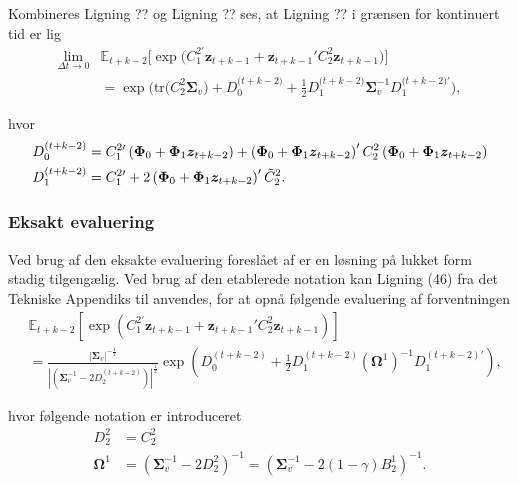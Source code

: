 \documentclass[
  a4paper,
  oneside]{memoir}
\begin{document}
Kombineres Ligning ?? og Ligning ?? ses, at Ligning ?? i grænsen for kontinuert tid er lig
\begin{align*}
\lim_{\Delta t \to 0} &\mathbb{E}_{t+k-2}\Big[ \exp\Big( C_1^{2\prime} \bm{z}_{t+k-1} + \bm{z}_{t+k-1}' C_2^2 \bm{z}_{t+k-1} \Big)\Big]\\
                      &=\exp\Big( \text{tr}\Big(C_2^2\bm{\Sigma}_v\Big) + D_0^{\Big(t+k-2\Big)} + \frac{1}{2} D_1^{\Big(t+k-2\Big)} \bm{\Sigma}_v^{-1} D_1^{\Big(t+k-2\Big)'} \Big),
\end{align*}

hvor
\begin{align*}
D_0^{\left(t+k-2\right)}&=C_1^{2\prime} \left(\bm{\Phi}_0+\bm{\Phi}_1\bm{z}_{t+k-2} \right) + \left(\bm{\Phi}_0+\bm{\Phi}_1\bm{z}_{t+k-2} \right)' C_2^2 \left(\bm{\Phi}_0+\bm{\Phi}_1\bm{z}_{t+k-2}\right) \\
D_1^{\left(t+k-2\right)}&=C_1^{2\prime} + 2\left(\bm{\Phi}_0+\bm{\Phi}_1\bm{z}_{t+k-2}\right)' \Tilde{C}_2^{2}.
\end{align*}

\hypertarget{eksakt-evaluering}{%
\subsubsection{Eksakt evaluering}\label{eksakt-evaluering}}

Ved brug af den eksakte evaluering foreslået af \citep{CampVicCha2003} er en løsning på lukket form stadig tilgengælig. Ved brug af den etablerede notation kan Ligning (46) fra det Tekniske Appendiks til \citep{CampVicCha2003} anvendes, for at opnå følgende evaluering af forventningen
\begin{align*}
&\mathbb{E}_{t+k-2}\left[ \exp\left( C_1^{2\prime} \bm{z}_{t+k-1} + \bm{z}_{t+k-1}' C_2^2 \bm{z}_{t+k-1} \right) \right]\\
&= \frac{\left| \bm{\Sigma}_v \right|^{-\tfrac{1}{2}}}{\left| \left(\bm{\Sigma}_v^{-1} - 2 D_2^{\left(t+k-2\right)}\right) \right|^{\tfrac{1}{2}}}\exp\left(D_0^{\left(t+k-2\right)} + \frac{1}{2} D_1^{\left(t+k-2\right)} \left(\bm{\Omega}^1\right)^{-1} D_1^{\left(t+k-2\right)\prime}\right),
\end{align*}

hvor følgende notation er introduceret
\begin{align*}
D_2^2&=C_2^2\\
\bm{\Omega}^1&=\left(\bm{\Sigma}_v^{-1} - 2D_2^2\right)^{-1}=\left(\bm{\Sigma}_v^{-1}  - 2\left(1-\gamma\right) B_2^1\right)^{-1}.
\end{align*}
\end{document}
